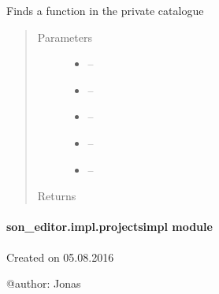 \documentclass[letterpaper,10pt,english]{sphinxmanual}
\begin{document}
\begin{fulllineitems}
\label{_source/son_editor.impl:son_editor.impl.private_catalogue_impl.query_private_nsfs}
Finds a function in the private catalogue
\begin{quote}\begin{description}
\item[{Parameters}] \leavevmode\begin{itemize}
\item {} 
 -- 

\item {} 
 -- 

\item {} 
 -- 

\item {} 
 -- 

\item {} 
 -- 

\end{itemize}

\item[{Returns}] \leavevmode


\end{description}\end{quote}

\end{fulllineitems}



\paragraph{son\_editor.impl.projectsimpl module}
\label{_source/son_editor.impl:son-editor-impl-projectsimpl-module}\label{_source/son_editor.impl:module-son_editor.impl.projectsimpl}
Created on 05.08.2016

@author: Jonas
\end{document}

